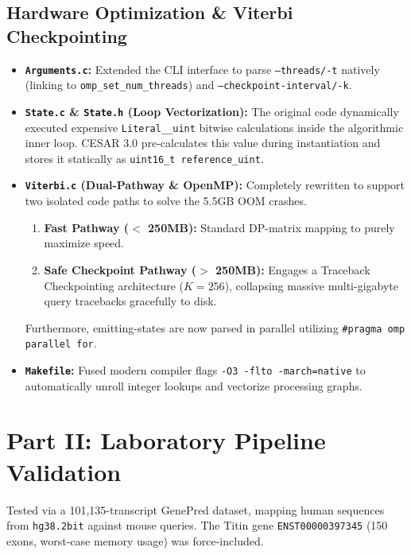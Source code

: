 \documentclass[11pt,a4paper]{article}
\begin{document}
\subsection{Hardware Optimization \& Viterbi Checkpointing}
\begin{itemize}
    \item \textbf{\texttt{Arguments.c}:} Extended the CLI interface to parse \texttt{--threads/-t} natively (linking to \texttt{omp\_set\_num\_threads}) and \texttt{--checkpoint-interval/-k}.
    \item \textbf{\texttt{State.c} \& \texttt{State.h} (Loop Vectorization):} The original code dynamically executed expensive \texttt{Literal\_\_uint} bitwise calculations inside the algorithmic inner loop. CESAR 3.0 pre-calculates this value during instantiation and stores it statically as \texttt{uint16\_t reference\_uint}.
    \item \textbf{\texttt{Viterbi.c} (Dual-Pathway \& OpenMP):} Completely rewritten to support two isolated code paths to solve the 5.5GB OOM crashes.
    \begin{enumerate}
        \item \textbf{Fast Pathway ($<$ 250MB):} Standard DP-matrix mapping to purely maximize speed.
        \item \textbf{Safe Checkpoint Pathway ($>$ 250MB):} Engages a Traceback Checkpointing architecture ($K=256$), collapsing massive multi-gigabyte query tracebacks gracefully to disk.
    \end{enumerate}
    Furthermore, emitting-states are now parsed in parallel utilizing \texttt{\#pragma omp parallel for}.
    \item \textbf{\texttt{Makefile}:} Fused modern compiler flags \texttt{-O3 -flto -march=native} to automatically unroll integer lookups and vectorize processing graphs.
\end{itemize}

\section{Part II: Laboratory Pipeline Validation}
Tested via a 101,135-transcript GenePred dataset, mapping human sequences from \texttt{hg38.2bit} against mouse queries. The Titin gene \texttt{ENST00000397345} (150 exons, worst-case memory usage) was force-included.
\end{document}
